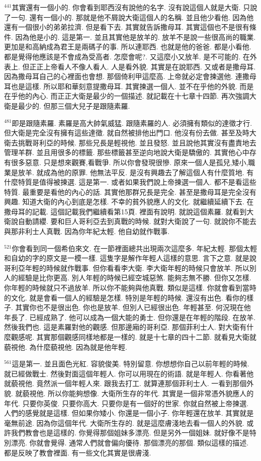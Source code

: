 \documentclass{book}
\begin{document}
$^{441}$其實還有一個小的.
你會看到耶西沒有說他的名字.
沒有說這個人就是大衛.
只說了一句.
還有一個小的.
那就是他不屑說大衛這個人的名稱.
並且他少看他.
因為他還有一個很小的弟弟拉濟.
但是看下去.
其實就告訴撒母耳.
其實這個也不是很有條件.
因為他是小的.
這是第一.
並且其實他是放羊的.
放羊不是說一些很高尚的職業.
更加是和高納成為君王是兩碼子的事.
所以連耶西.
也就是他的爸爸.
都是小看他.
都是覺得他應該是不會成為受高者.
怎麼會呢?.
又這麼小又放羊.
是不可能的.
在外表上.
但正正上帝看人不像人看人.
人是看外貌.
其實是在說耶西.
又或者是撒母耳.
因為撒母耳自己的心裡面也會想.
那個倚利甲這麼高.
上帝就必定會揀選他.
連撒母耳也是這樣.
所以耶和華刻意提撒母耳.
其實揀選一個人.
並不在乎他的外貌.
而是在乎他的內心.
而正正大衛是最少的一個描述.
就記載在十七章十四節.
再次強調大衛是最少的.
但那三個大兒子是跟隨素羅.

$^{481}$即是跟隨素羅.
素羅是高大帥氣威猛.
跟隨素羅的人.
必須擁有類似的達徵才行.
但大衛是完全沒有擁有這些達徵.
就自然被排他出門口.
他沒有份去做.
甚至及時大衛去挑戰哥利亞的時候.
那些兄長是輕視他.
並且發怒.
並且說他其實沒有盡責地去管理羊群.
並且用很多的標籤.
那些標籤甚至逆向地說大衛是驕傲的.
其實他心中存有很多惡意.
只是想來觀賽,看戰爭.
所以你會發現很慘.
原來一個人是孤兒,矮小,職業是放羊.
就成為他的原罪.
他無法平反.
是沒有興趣去了解這個人有什麼質地.
有什麼特質是值得被揀選.
這是第一.
或者如果我們說上帝揀選一個人.
都不是看這些特質.
最重要是看他的內心的話.
其實他那群兄長是完全.
甚至是撒母耳是完全沒有興趣.
知道大衛的內心到底是怎樣.
不幸的貧外貌應人的文化.
就繼續延續下去.
在撒母耳的記載.
這個記載我們繼續看第15頁.
裡面有說明.
就說這個素羅.
就看到大衛說自動請纓.
要和巨人哥利亞去到真戰的時候.
就對大衛說了一句.
就說你不能去與那非利士人真戰.
因為你年紀太輕.
他自幼就作戰事.

$^{521}$你會看到同一個希伯來文.
在一節裡面總共出現兩次這麼多.
年紀太輕.
那個太輕和自幼的字的原文是一模一樣.
這隻字是解作年輕人這樣的意思.
言下之意.
就是說哥利亞年輕的時候就作戰事.
但你看看李大衛.
李大衛年輕的時候只會放羊.
所以別人的經驗是比你更高.
別人年輕的時候已經空城惡煞.
能夠志無不勝.
但你又怎樣.
你年輕的時候就只不過放羊.
所以你不能夠與他真戰.
類似是這樣.
你就會看到當時的文化.
就是會看一個人的經驗是怎樣.
特別是年輕的時候.
還沒有出色.
看你的樣子.
其實你也不是很出色.
你也是放羊.
但別人已經很出色.
年輕甚至.
何況現在他年長了.
已經成熟了.
他可以成為一個大能的勇士.
但你還是在年輕的階段.
在放羊.
然後我們也.
這是素羅對他的觀感.
但那邊廂的哥利亞.
那個菲利士人.
對大衛有什麼觀感呢.
其實那個觀感同樣地都是一樣的.
就是十七章的四十二節.
就看見大衛就藐視他.
為什麼藐視他.
因為就是他年輕.

$^{561}$這是第一.
並且面色光紅.
容貌俊美.
特別留意.
你想想你自己以前年輕的時候.
就已經做戰士.
然後對面這個年輕人.
你可以用現在的術語.
就是年輕人.
你看著他就藐視他.
竟然派一個年輕人來.
跟我去打工.
就算連那個菲利士人.
一看到那個外貌.
就藐視他.
所以你能夠想像.
大衛所生存的年代.
其實是一個非常憑外貌應人的年代.
只要你英俊.
只要你高大.
只要你是有一個好的世家.
你就自然被上帝揀選.
人們的感覺就是這樣.
但如果你矮小.
你還是一個小子.
你年輕還在放羊.
其實就是毫無前途.
因為你這個年代.
大衛所生存的.
就是這麼膚淺地去看一個人的外貌.
或許我們教會也是這樣的.
你覺得那個姐妹多漂亮.
但是另外一個姐妹.
就好像不是特別漂亮.
你就會覺得.
通常人們就會偏向優待.
那個漂亮的那個.
類似這樣的描述.
都是反映了教會裡面.
有一些文化其實是很膚淺.
\end{document}
